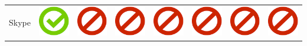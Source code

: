 \documentclass[10pt,foldmark,tumble]{leaflet}
\begin{document}
\begin{center}
{{\begin{tabular}{ L{2cm} | C{2cm} | C{2cm} | C{2cm} | C{2cm} | C{2cm} | C{2cm} | C{2cm} }
Skype & \includegraphics[scale=0.1]{pics/haken.png} & \includegraphics[scale=0.1]{pics/nohaken.png} & \includegraphics[scale=0.1]{pics/nohaken.png} & \includegraphics[scale=0.1]{pics/nohaken.png} & \includegraphics[scale=0.1]{pics/nohaken.png} & \includegraphics[scale=0.1]{pics/nohaken.png} & \includegraphics[scale=0.1]{pics/nohaken.png} \tabularnewline

\end{tabular}}}
\end{center}
\end{document}

